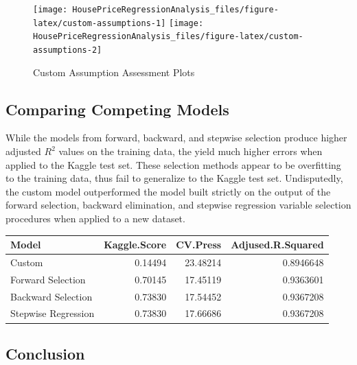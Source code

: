 \documentclass[american,]{article}
\begin{document}
\begin{figure}[htbp]

{\centering \texttt{[image: HousePriceRegressionAnalysis\_files/figure-latex/custom-assumptions-1]} \texttt{[image: HousePriceRegressionAnalysis\_files/figure-latex/custom-assumptions-2]} 

}

\caption{Custom Assumption Assessment Plots}\label{fig:custom-assumptions}
\end{figure}

\newpage

\hypertarget{comparing-competing-models-1}{%
\subsection{Comparing Competing
Models}\label{comparing-competing-models-1}}

While the models from forward, backward, and stepwise selection produce
higher adjusted \(R^2\) values on the training data, the yield much
higher errors when applied to the Kaggle test set. These selection
methods appear to be overfitting to the training data, thus fail to
generalize to the Kaggle test set. Undisputedly, the custom model
outperformed the model built strictly on the output of the forward
selection, backward elimination, and stepwise regression variable
selection procedures when applied to a new dataset.

\begin{table}[H]
\centering
\begin{tabular}{lrrr}
\toprule
Model & Kaggle.Score & CV.Press & Adjused.R.Squared\\
\midrule
Custom & 0.14494 & 23.48214 & 0.8946648\\
Forward Selection & 0.70145 & 17.45119 & 0.9363601\\
Backward Selection & 0.73830 & 17.54452 & 0.9367208\\
Stepwise Regression & 0.73830 & 17.66686 & 0.9367208\\
\bottomrule
\end{tabular}
\end{table}

\hypertarget{conclusion-1}{%
\subsection{Conclusion}\label{conclusion-1}}
\end{document}
